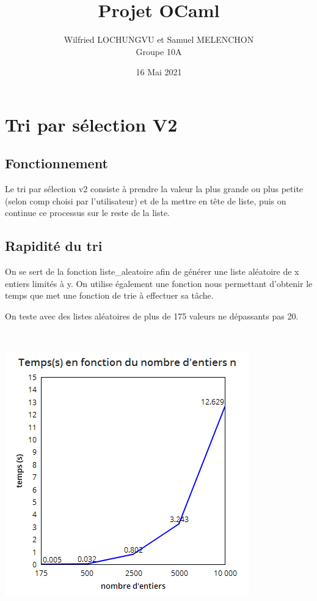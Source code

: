 \documentclass[a4paper, 12pt]{article}
\title{Projet OCaml}
\author{Wilfried LOCHUNGVU et Samuel MELENCHON \\ Groupe 10A}
\date{16 Mai 2021}
\begin{document}
\maketitle

\newpage


\tableofcontents

\newpage
\section{Tri par sélection V2}
\subsection{Fonctionnement}

Le tri par sélection v2 consiste à prendre la valeur la plus grande ou plus petite (selon comp choisi par l'utilisateur) et de la mettre en tête de liste, puis on continue ce processus sur le reste de la liste.

\subsection{Rapidité du tri}

On se sert de la fonction liste\_aleatoire afin de générer une liste aléatoire de x entiers limités à y.
On utilise également une fonction nous permettant d'obtenir le temps que met une fonction de trie à effectuer sa tâche.

On teste avec des listes aléatoires de plus de 175 valeurs ne dépassants pas 20.

~
\begin{center}
\includegraphics[scale=0.5]{triselN.png}
\end{center}
~
\end{document}
